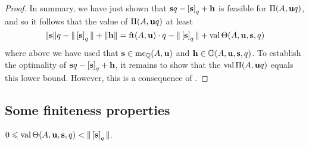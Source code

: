 \documentclass[11pt]{amsart}
\begin{document}
\begin{proof}
In summary, we have just shown that $\mathbf{s}q-\left[ \mathbf{s} \right]_q + \mathbf{h}$ is feasible for $\Pi(A, \mathbf{u}q)$, and so it follows that the value of $\Pi(A, \mathbf{u}q)$ at least 
\[  \| \mathbf{s} \|q - \| \left[ \mathbf{s} \right]_q \| + \| \mathbf{h} \| = \operatorname{ft}(A, \mathbf{u}) \cdot q - \| \left[ \mathbf{s} \right]_q \| + \operatorname{val} \Theta(A, \mathbf{u}, \mathbf{s}, q) \] 
where above we have used that $\mathbf{s} \in \operatorname{mc}_{\mathbb{Q}}(A, \mathbf{u})$ and $\mathbf{h} \in \mathbb{O}(A, \mathbf{u}, \mathbf{s}, q)$.  To establish the optimality of $\mathbf{s}q - \left[ \mathbf{s} \right]_q + \mathbf{h}$, it remains to show that the $\operatorname{val} \Pi(A, \mathbf{u}q)$ equals this lower bound.  However, this is a consequence of .
\end{proof}




\subsection{Some finiteness properties}  

\begin{lemma}
\label{bounded value: L} 
$0 \leqslant  \operatorname{val}  \Theta(A, \mathbf{u}, \mathbf{s}, q) < \| \left[ \mathbf{s} \right]_q \|$.  
\end{lemma}
\end{document}

